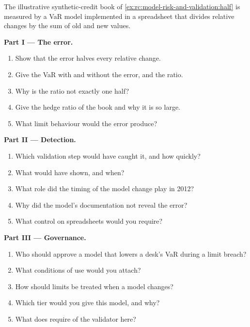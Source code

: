 \begin{problem}\label{pb:rc:model-risk-and-validation:1}
The illustrative synthetic-credit book of \cref{ex:rc:model-risk-and-validation:half} is measured by a
VaR model implemented in a spreadsheet that divides relative changes by the sum of old and new values.

\medskip\noindent\textbf{Part I --- The error.}
\begin{enumerate}
\item Show that the error halves every relative change.
\item Give the VaR with and without the error, and the ratio.
\item Why is the ratio not exactly one half?
\item Give the hedge ratio of the book and why it is so large.
\item What limit behaviour would the error produce?
\end{enumerate}

\medskip\noindent\textbf{Part II --- Detection.}
\begin{enumerate}[resume]
\item Which validation step would have caught it, and how quickly?
\item What would  have shown, and when?
\item What role did the timing of the model change play in 2012?
\item Why did the model's documentation not reveal the error?
\item What control on spreadsheets would you require?
\end{enumerate}

\medskip\noindent\textbf{Part III --- Governance.}
\begin{enumerate}[resume]
\item Who should approve a model that lowers a desk's VaR during a limit breach?
\item What conditions of use would you attach?
\item How should limits be treated when a model changes?
\item Which tier would you give this model, and why?
\item What does  require of the validator here?
\end{enumerate}


\end{problem}
